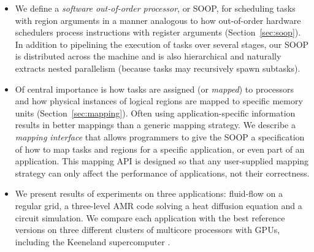 \documentclass[conference]{IEEEtran}
\begin{document}
\begin{itemize}

\item We define a {\em software out-of-order processor}, or SOOP, for
  scheduling tasks with region arguments in a manner analogous to how
  out-of-order hardware schedulers process instructions with register
  arguments (Section~\ref{sec:soop}).  In addition to pipelining the execution of tasks over
  several stages, our SOOP is distributed across the machine and is
  also hierarchical and naturally extracts nested
  parallelism (because tasks may recursively spawn subtasks).



\item Of central importance is how
tasks are assigned (or {\em mapped}) to processors and how physical instances of logical regions are
mapped to specific memory units (Section~\ref{sec:mapping}).  Often using
application-specific information results in better
mappings than a generic mapping strategy.  We describe
a {\em mapping interface} that allows programmers to give the SOOP a specification
of how to map tasks and regions for a specific application, or even part of an
application.  This mapping API is designed so that
any user-supplied mapping strategy can only affect the performance of applications,
not their correctness.  


\item We present results of experiments on three applications:
  fluid-flow on a regular grid, a three-level AMR code solving a
  heat diffusion equation and a circuit simulation.
  We compare each application with the best reference
  versions on three different clusters of multicore processors with
  GPUs, including the Keeneland supercomputer \cite{Keeneland}.
%
%

\end{itemize}







%



\end{document}
